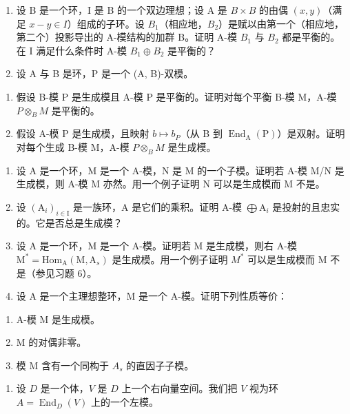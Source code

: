 \begin{enumerate}
\def\labelenumi{\arabic{enumi})}
\setcounter{enumi}{2}
\item
  设 B 是一个环，I 是 B 的一个双边理想；设 A 是 \(B \times B\) 的由偶 \((x, y)\)（满足 \(x - y \in I\)）组成的子环。设 \(B_{1}\)（相应地，\(B_{2}\)）是赋以由第一个（相应地，第二个）投影导出的 A-模结构的加群 B。证明 A-模 \(B_{1}\) 与 \(B_{2}\) 都是平衡的。在 I 满足什么条件时 A-模 \(B_{1} \oplus B_{2}\) 是平衡的？
\item
  设 A 与 B 是环，P 是一个 (A, B)-双模。
\end{enumerate}

\begin{enumerate}
\def\labelenumi{\alph{enumi})}
\item
  假设 B-模 P 是生成模且 A-模 P 是平衡的。证明对每个平衡 B-模 M，A-模 \(P \otimes_{B} M\) 是平衡的。
\item
  假设 A-模 P 是生成模，且映射 \(b \mapsto b_{P}\)（从 B 到 \(\operatorname{End}_{\mathrm{A}}(\mathrm{P})\)）是双射。证明对每个生成 B-模 M，A-模 \(P \otimes_{B} M\) 是生成模。
\end{enumerate}

\begin{enumerate}
\def\labelenumi{\arabic{enumi})}
\setcounter{enumi}{4}
\item
  设 A 是一个环，M 是一个 A-模，N 是 M 的一个子模。证明若 A-模 M/N 是生成模，则 A-模 M 亦然。用一个例子证明 N 可以是生成模而 M 不是。
\item
  设 \((\mathrm{A}_i)_{i\in \mathrm{I}}\) 是一族环，A 是它们的乘积。证明 A-模 \(\bigoplus \mathrm{A}_i\) 是投射的且忠实的。它是否总是生成模？
\item
  设 A 是一个环，M 是一个 A-模。证明若 M 是生成模，则右 A-模 \(\mathrm{M}^{*} = \mathrm{Hom}_{\mathrm{A}}(\mathrm{M}, \mathrm{A}_{s})\) 是生成模。用一个例子证明 \(M^{*}\) 可以是生成模而 M 不是（参见习题 6）。
\item
  设 A 是一个主理想整环，M 是一个 A-模。证明下列性质等价：
\end{enumerate}

\begin{enumerate}
\def\labelenumi{(\roman{enumi})}
\item
  A-模 M 是生成模。
\item
  M 的对偶非零。
\item
  模 M 含有一个同构于 \(A_{s}\) 的直因子子模。
\end{enumerate}

\begin{enumerate}
\def\labelenumi{\arabic{enumi})}
\setcounter{enumi}{8}
\tightlist
\item
  设 \(D\) 是一个体，\(V\) 是 \(D\) 上一个右向量空间。我们把 \(V\) 视为环 \(A = \operatorname{End}_D(V)\) 上的一个左模。
\end{enumerate}

